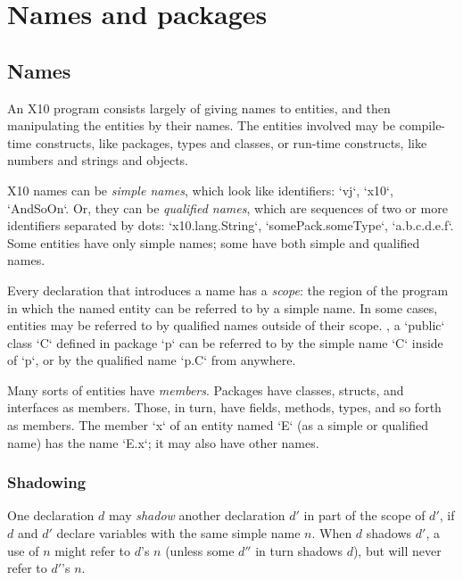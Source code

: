 \chapter{Names and packages}
\label{packages} 

\section{Names}

An X10 program consists largely of giving names to entities, and then
manipulating the entities by their names. The entities involved may be
compile-time constructs, like packages, types and classes, or run-time
constructs, like numbers and strings and objects.  

X10 names can be {\em simple names}, which look like identifiers: \xcd`vj`,
\xcd`x10`, \xcd`AndSoOn`. Or, they can be {\em qualified names}, which are
sequences of two or more identifiers separated by dots: \xcd`x10.lang.String`, 
\xcd`somePack.someType`, \xcd`a.b.c.d.e.f`.   Some entities have only simple
names; some have both simple and qualified names.

Every declaration that introduces a name has a {\em scope}: the region of the
program in which the named entity can be referred to by a simple name.  
In some cases, entities may be referred to by qualified names outside of their
scope.  \Eg, a \xcd`public` class \xcd`C` defined in package \xcd`p` can be
referred to by the simple name \xcd`C` inside of \xcd`p`, or by the qualified
name \xcd`p.C` from anywhere.  

Many sorts of entities have {\em members}.  Packages have classes, structs,
and interfaces as members.  Those, in turn, have fields, methods, types, and
so forth as members.  The member \xcd`x` of an entity named \xcd`E` (as a
simple or qualified name) has the name \xcd`E.x`; it may also have other
names.  

\subsection{Shadowing}

One declaration $d$ may {\em shadow} another declaration $d'$ in part of the
scope of $d'$, if $d$ and $d'$ declare variables with the same simple name $n$.
When $d$ shadows $d'$, a use of $n$ might refer to $d$'s $n$ (unless some
$d''$ in turn shadows $d$), but will never refer to $d'$'s $n$.

